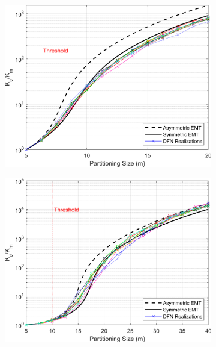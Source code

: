 \documentclass[main.tex]{subfiles}
\begin{document}
\begin{figure}[ht]
    \begin{subfigure}{0.3\textwidth}
        \includegraphics[width=\textwidth]{FSU/Plot_FSU_Case_05_nohead.png}
        \label{fig:FSU_C}
    \end{subfigure}
    \begin{subfigure}{0.3\textwidth}
        \includegraphics[width=\textwidth]{FSU/Plot_FSU_Case_09_nohead.png}
        \label{fig:FSU_D}
    \end{subfigure}
    \begin{subfigure}{0.3\textwidth}

\end{subfigure}
\end{figure}
\end{document}
